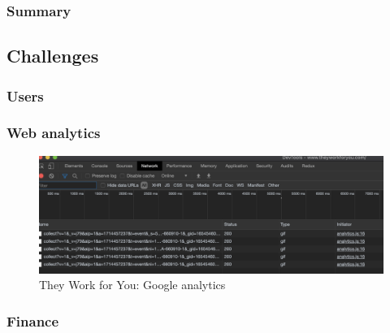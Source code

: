 \documentclass{article}
\begin{document}
        	\subsubsection*{Summary}
        	
        	        	        	        	        	                	        	          	     	
        \subsection*{Challenges}
        
        	\subsubsection*{Users}
        	    

        	\subsubsection*{Web analytics}
        	
        	
			\begin{figure}
				\centering
				\includegraphics[scale=0.4]{images/they-work-for-you-challenges-google-analytics}
				\caption{They Work for You: Google analytics}
				\label{fig:they-work-for-you-challenges-google-analytics}
			\end{figure}
			
        	\subsubsection*{Finance}
        	    
\end{document}
